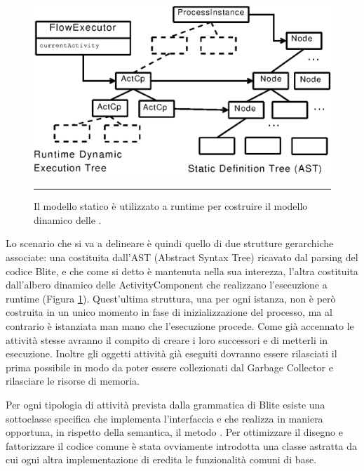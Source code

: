 \begin{figure}[t]
\begin{center}
  \includegraphics{architettura_interna/dia/tries}
  \caption[Blite-se: modello statico e modello dinamico]{Il modello statico è
  utilizzato a runtime per costruire il modello dinamico delle
  .}
   \rule{7cm}{0.01cm}
  \label{fig:2}
\end{center}
\end{figure}

Lo scenario che si va a delineare \`e quindi quello di due strutture gerarchiche
associate: una costituita dall'AST (Abstract Syntax Tree) ricavato dal parsing
del codice Blite, e che come si detto \`e mantenuta nella sua interezza, l'altra
costituita dall'albero dinamico delle ActivityComponent che realizzano
l'esecuzione a runtime (Figura \ref{fig:2}). Quest'ultima struttura, una per ogni
istanza, non \`e però costruita in un unico momento in fase di inizializzazione
del  processo, ma al contrario \`e istanziata man mano che l'esecuzione procede. 
Come già accennato le attività stesse avranno il compito di creare i loro
successori e di metterli in esecuzione. Inoltre gli oggetti attività già eseguiti
dovranno essere rilasciati il prima possibile in modo da poter essere
collezionati dal Garbage Collector e rilasciare le risorse di memoria.



Per ogni tipologia di attività prevista dalla grammatica di Blite esiste
una sottoclasse specifica che implementa l'interfaccia
 e che realizza in maniera opportuna, in rispetto
della semantica, il metodo . 
Per ottimizzare il disegno e fattorizzare
il codice comune \`e stata ovviamente introdotta una classe astratta
 da cui ogni altra implementazione di
 eredita le funzionalità comuni di base.

